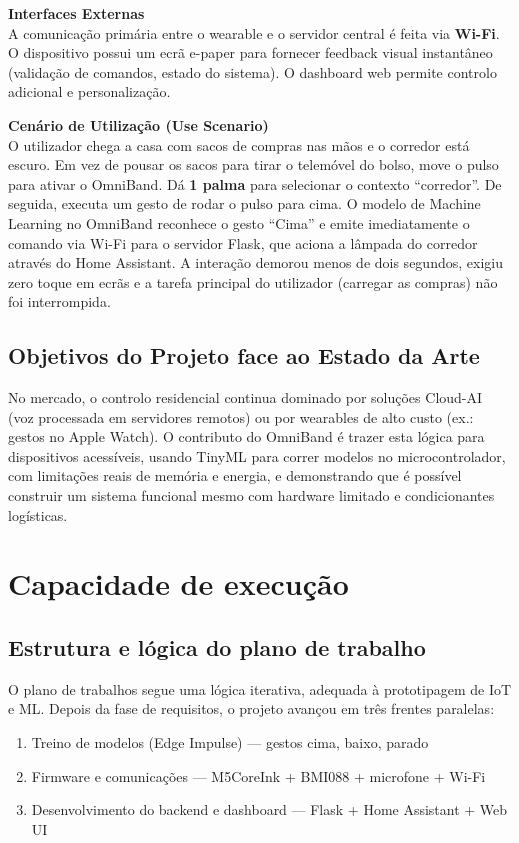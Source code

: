 \documentclass[11pt, a4paper]{article}
\begin{document}
\textbf{Interfaces Externas}\\
A comunicação primária entre o wearable e o servidor central é feita via \textbf{Wi-Fi}. O dispositivo possui um ecrã e-paper para fornecer feedback visual instantâneo (validação de comandos, estado do sistema). O dashboard web permite controlo adicional e personalização.

\textbf{Cenário de Utilização (Use Scenario)}\\
O utilizador chega a casa com sacos de compras nas mãos e o corredor está escuro. Em vez de pousar os sacos para tirar o telemóvel do bolso, move o pulso para ativar o OmniBand. Dá \textbf{1 palma} para selecionar o contexto ``corredor''. De seguida, executa um gesto de rodar o pulso para cima. O modelo de Machine Learning no OmniBand reconhece o gesto ``Cima'' e emite imediatamente o comando via Wi-Fi para o servidor Flask, que aciona a lâmpada do corredor através do Home Assistant. A interação demorou menos de dois segundos, exigiu zero toque em ecrãs e a tarefa principal do utilizador (carregar as compras) não foi interrompida.

\subsection{Objetivos do Projeto face ao Estado da Arte}
No mercado, o controlo residencial continua dominado por soluções Cloud-AI (voz processada em servidores remotos) ou por wearables de alto custo (ex.: gestos no Apple Watch). O contributo do OmniBand é trazer esta lógica para dispositivos acessíveis, usando TinyML para correr modelos no microcontrolador, com limitações reais de memória e energia, e demonstrando que é possível construir um sistema funcional mesmo com hardware limitado e condicionantes logísticas.

\section{Capacidade de execução}
\subsection{Estrutura e lógica do plano de trabalho}
O plano de trabalhos segue uma lógica iterativa, adequada à prototipagem de IoT e ML. Depois da fase de requisitos, o projeto avançou em três frentes paralelas:
\begin{enumerate}
    \item Treino de modelos (Edge Impulse) — gestos cima, baixo, parado
    \item Firmware e comunicações — M5CoreInk + BMI088 + microfone + Wi-Fi
    \item Desenvolvimento do backend e dashboard — Flask + Home Assistant + Web UI
\end{enumerate}
\end{document}
